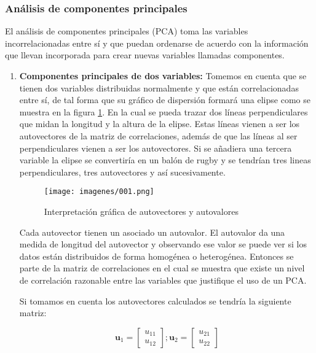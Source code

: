 \subsubsection{Análisis de componentes principales}
\citep{aldas2017analisis} El análisis de componentes principales (PCA) toma las variables incorrelacionadas entre sí y que puedan ordenarse de acuerdo con la información que llevan incorporada para crear nuevas variables llamadas componentes.

\begin{enumerate}
    \item \textbf{Componentes principales de dos variables:} Tomemos en cuenta que se tienen dos variables distribuidas normalmente y que están correlacionadas entre sí, de tal forma que su gráfico de dispersión formará una elipse como se muestra en la figura \ref{fig:autovec_autova_2dim}. En la cual se pueda trazar dos líneas perpendiculares que midan la longitud y la altura de la elipse. Estas líneas vienen a ser los autovectores de la matriz de correlaciones, además de que las líneas al ser perpendiculares vienen a ser los autovectores. Si se añadiera una tercera variable la elipse se convertiría en un balón de rugby y se tendrían tres lineas perpendiculares, tres autovectores y así sucesivamente.

    \begin{figure}[htb]
    \centering
    \texttt{[image: imagenes/001.png]}
    \caption{Interpretación gráfica de autovectores y autovalores \citep{aldas2017analisis}}
    \label{fig:autovec_autova_2dim}
    \end{figure}

    Cada autovector tienen un asociado un autovalor. El autovalor da una medida de longitud del autovector y observando ese valor se puede ver si los datos están distribuidos de forma homogénea o heterogénea. Entonces se parte de la matriz de correlaciones en el cual se muestra que existe un nivel de correlación razonable entre las variables que justifique el uso de un PCA.

    Si tomamos en cuenta los autovectores calculados se tendría la siguiente matriz:

    $$\mathbf{u}_1 = \begin{bmatrix} u_{11} \\ u_{12} \end{bmatrix} ; \mathbf{u}_2 = \begin{bmatrix} u_{21} \\ u_{22} \end{bmatrix}$$



\end{enumerate}
